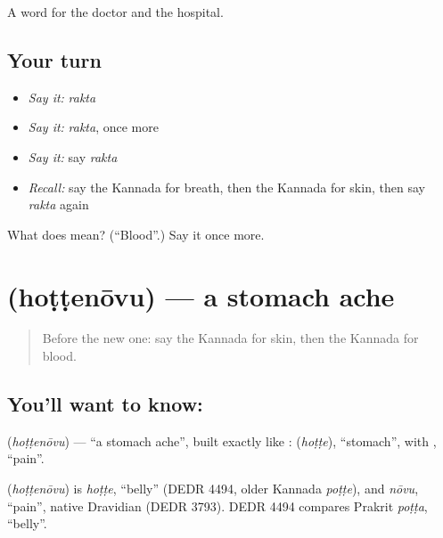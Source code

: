 \begin{grammarlens}[title={What you've built}]
A word for the doctor and the hospital.
\end{grammarlens}

\subsection*{Your turn}
\begin{itemize}
\raggedright
  \item \emph{Say it:} \emph{rakta}
  \item \emph{Say it:} \emph{rakta}, once more
  \item \emph{Say it:} say \emph{rakta}
  \item \emph{Recall:} say the Kannada for breath, then the Kannada for skin, then say \emph{rakta} again
\end{itemize}

\begin{tcolorbox}[breakable,colback=teal!4,colframe=teal!35!black,title={Before you move on}]
What does  mean? (\textquotedblleft{}Blood\textquotedblright{}.) Say it once more.
\end{tcolorbox}
\section[\texorpdfstring{\kn{ಹೊಟ್ಟೆನೋವು} (hoṭṭenōvu)}{ಹೊಟ್ಟೆನೋವು (hoṭṭenōvu)}]{ (hoṭṭenōvu) — a stomach ache}

\label{lesson:KA-C99-stomachache}



\begin{quote}
Before the new one: say the Kannada for skin, then the Kannada for blood.
\end{quote}

\subsection*{You'll want to know: }
\textbf{} (\emph{hoṭṭenōvu}) — \textquotedblleft{}a stomach ache\textquotedblright{}, built exactly like \textbf{}: \textbf{} (\emph{hoṭṭe}), \textquotedblleft{}stomach\textquotedblright{}, with \textbf{}, \textquotedblleft{}pain\textquotedblright{}.

\begin{cousinweb}
\textbf{} (\emph{hoṭṭenōvu}) is \emph{hoṭṭe}, \textquotedblleft{}belly\textquotedblright{} (DEDR 4494, older Kannada \emph{poṭṭe}), and \emph{nōvu}, \textquotedblleft{}pain\textquotedblright{}, native Dravidian (DEDR 3793). DEDR 4494 compares Prakrit \emph{poṭṭa}, \textquotedblleft{}belly\textquotedblright{}.
\end{cousinweb}

